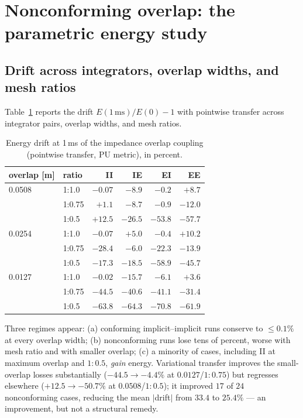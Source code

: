 \documentclass[11pt]{article}
\begin{document}
\section{Nonconforming overlap: the parametric energy study}
\label{sec:study}

\subsection{Drift across integrators, overlap widths, and mesh ratios}
\label{sec:observed}

Table~\ref{tab:drift-1ms} reports the drift $E(1\,\mathrm{ms})/E(0) - 1$
with pointwise transfer across integrator pairs, overlap widths, and mesh
ratios.

\begin{table}[htbp]
\centering
\caption{Energy drift at 1\,ms of the impedance overlap coupling
(pointwise transfer, PU metric), in percent.}
\label{tab:drift-1ms}
\begin{tabular}{llrrrr}
\toprule
overlap [m] & ratio & II & IE & EI & EE \\
\midrule
0.0508 & 1:1.0 & $-0.07$ & $-8.9$ & $-0.2$ & $+8.7$ \\
       & 1:0.75 & $+1.1$  & $-8.7$ & $-0.9$ & $-12.0$ \\
       & 1:0.5 & $+12.5$ & $-26.5$ & $-53.8$ & $-57.7$ \\
0.0254 & 1:1.0 & $-0.07$ & $+5.0$ & $-0.4$ & $+10.2$ \\
       & 1:0.75 & $-28.4$ & $-6.0$ & $-22.3$ & $-13.9$ \\
       & 1:0.5 & $-17.3$ & $-18.5$ & $-58.9$ & $-45.7$ \\
0.0127 & 1:1.0 & $-0.02$ & $-15.7$ & $-6.1$ & $+3.6$ \\
       & 1:0.75 & $-44.5$ & $-40.6$ & $-41.1$ & $-31.4$ \\
       & 1:0.5 & $-63.8$ & $-64.3$ & $-70.8$ & $-61.9$ \\
\bottomrule
\end{tabular}
\end{table}

Three regimes appear: (a) conforming implicit--implicit runs conserve to
$\le 0.1\%$ at every overlap width; (b) nonconforming runs lose tens of
percent, worse with mesh ratio and with smaller overlap; (c) a minority of
cases, including II at maximum overlap and $1{:}0.5$, \emph{gain} energy.
Variational transfer improves the small-overlap losses substantially
($-44.5 \to -4.4\%$ at $0.0127$/$1{:}0.75$) but regresses elsewhere
($+12.5 \to -50.7\%$ at $0.0508$/$1{:}0.5$); it improved $17$ of $24$
nonconforming cases, reducing the mean $\lvert$drift$\rvert$ from $33.4$
to $25.4\%$ --- an improvement, but not a structural remedy.
\end{document}
